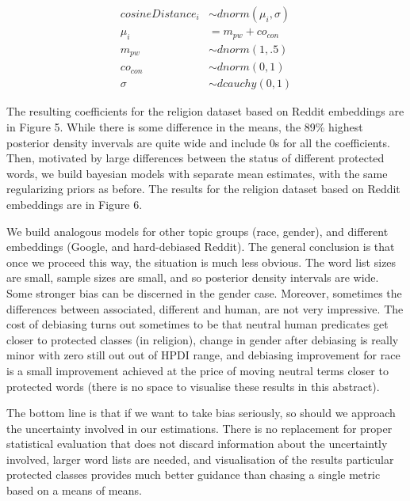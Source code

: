 \documentclass[
  12pt,
  dvipsnames,enabledeprecatedfontcommands]{scrartcl}
\begin{document}
\footnotesize

\vspace{-5mm}

\begin{align}
cosineDistance_i  & \sim dnorm(\mu_i, \sigma) \\
\mu_i & = m_{pw} + co_{con}\\
m_{pw} & \sim dnorm(1,.5) \\
co_{con} & \sim dnorm(0,1) \\
\sigma &\sim  dcauchy(0,1)
\end{align} \normalsize 

The resulting coefficients for the religion dataset based on Reddit
embeddings are in Figure 5. While there is some difference in the means,
the 89\% highest posterior density invervals are quite wide and include
0s for all the coefficients. Then, motivated by large differences
between the status of different protected words, we build bayesian
models with separate mean estimates, with the same regularizing priors
as before. The results for the religion dataset based on Reddit
embeddings are in Figure 6.

We build analogous models for other topic groups (race, gender), and
different embeddings (Google, and hard-debiased Reddit). The general
conclusion is that once we proceed this way, the situation is much less
obvious. The word list sizes are small, sample sizes are small, and so
posterior density intervals are wide. Some stronger bias can be
discerned in the gender case. Moreover, sometimes the differences
between associated, different and human, are not very impressive. The
cost of debiasing turns out sometimes to be that neutral human
predicates get closer to protected classes (in religion), change in
gender after debiasing is really minor with zero still out out of HPDI
range, and debiasing improvement for race is a small improvement
achieved at the price of moving neutral terms closer to protected words
(there is no space to visualise these results in this abstract).

The bottom line is that if we want to take bias seriously, so should we
approach the uncertainty involved in our estimations. There is no
replacement for proper statistical evaluation that does not discard
information about the uncertaintly involved, larger word lists are
needed, and visualisation of the results particular protected classes
provides much better guidance than chasing a single metric based on a
means of means.

\pagebreak
\end{document}
